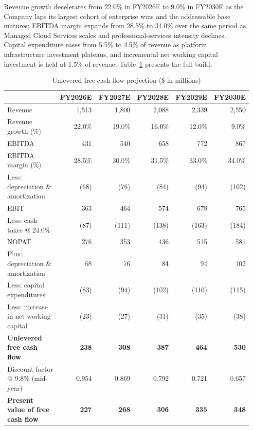 Revenue growth decelerates from 22.0\% in FY2026E to 9.0\% in FY2030E as the Company laps its largest cohort of enterprise wins and the addressable base matures; EBITDA margin expands from 28.5\% to 34.0\% over the same period as Managed Cloud Services scales and professional-services intensity declines. Capital expenditure eases from 5.5\% to 4.5\% of revenue as platform infrastructure investment plateaus, and incremental net working capital investment is held at 1.5\% of revenue. Table~\ref{tab:dcf-fcf} presents the full build.

\begin{table}[H]
\centering
\small
\caption{Unlevered free cash flow projection (\$ in millions)}
\label{tab:dcf-fcf}
\begin{tabular}{@{}lrrrrr@{}}
\toprule
& \textbf{FY2026E} & \textbf{FY2027E} & \textbf{FY2028E} & \textbf{FY2029E} & \textbf{FY2030E} \\
\midrule
Revenue & 1,513 & 1,800 & 2,088 & 2,339 & 2,550 \\
\quad Revenue growth (\%) & 22.0\% & 19.0\% & 16.0\% & 12.0\% & 9.0\% \\
EBITDA & 431 & 540 & 658 & 772 & 867 \\
\quad EBITDA margin (\%) & 28.5\% & 30.0\% & 31.5\% & 33.0\% & 34.0\% \\
Less: depreciation \& amortization & (68) & (76) & (84) & (94) & (102) \\
\midrule
EBIT & 363 & 464 & 574 & 678 & 765 \\
Less: cash taxes @ 24.0\% & (87) & (111) & (138) & (163) & (184) \\
\midrule
NOPAT & 276 & 353 & 436 & 515 & 581 \\
Plus: depreciation \& amortization & 68 & 76 & 84 & 94 & 102 \\
Less: capital expenditures & (83) & (94) & (102) & (110) & (115) \\
Less: increase in net working capital & (23) & (27) & (31) & (35) & (38) \\
\midrule
\textbf{Unlevered free cash flow} & \textbf{238} & \textbf{308} & \textbf{387} & \textbf{464} & \textbf{530} \\
Discount factor @ 9.8\% (mid-year) & 0.954 & 0.869 & 0.792 & 0.721 & 0.657 \\
\textbf{Present value of free cash flow} & \textbf{227} & \textbf{268} & \textbf{306} & \textbf{335} & \textbf{348} \\
\bottomrule
\end{tabular}
\end{table}


